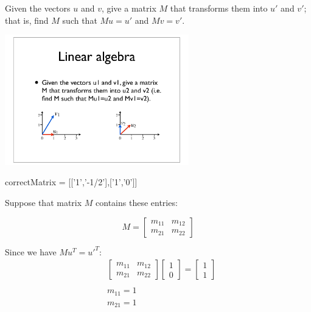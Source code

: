 \documentclass{ximera}
\begin{document}
\begin{question}
Given the vectors $u$ and $v$, give a matrix $M$ that transforms them
into $u'$ and $v'$; that is, find $M$ such that $M u=u'$ and $M v=v'$.
\begin{image}
\includegraphics[width=0.6\textwidth]{fig.pdf}
\end{image}

\begin{solution}
\begin{matrix-answer}[name=M]
    correctMatrix = [['1','-1/2'],['1','0']]
\end{matrix-answer}
\end{solution}

Suppose that matrix $M$ contains these entries:
\begin{center}
\begin{equation*}
M =
\begin{bmatrix}
m_{11} & m_{12} \\
m_{21} & m_{22}
\end{bmatrix}
\end{equation*}
\end{center}

Since we have $M u^T = u'^T$:
\begin{align*}
&\begin{bmatrix}
m_{11} & m_{12} \\
m_{21} & m_{22}
\end{bmatrix}
\begin{bmatrix}
1 \\
0
\end{bmatrix}
= 
\begin{bmatrix}
1 \\
1
\end{bmatrix} \\
\\
& m_{11} = 1 \\
& m_{21} = 1
\end{align*}


\end{question}
\end{document}
